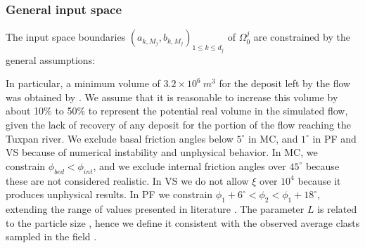 \documentclass[nhess, manuscript]{copernicus}
\begin{document}
\subsubsection{General input space}
The input space boundaries $\left(a_{k,{M_j}},b_{k,{M_j}}\right)_{1\le k\le d_j}$ of $\Omega_0^j$ are constrained by the general assumptions:
In particular, a minimum volume of $3.2 \times 10^6\ m^3$ for the deposit left by the flow was obtained by \cite{Saucedo2008}. We assume that it is reasonable to increase this volume by about 10\% to 50\% to represent the potential real volume in the simulated flow, given the lack of recovery of any deposit for the portion of the flow reaching the Tuxpan river. We exclude basal friction angles below $5^\circ$ in MC, and $1^\circ$ in PF and VS because of numerical instability and unphysical behavior. In MC, we constrain $\phi_{bed}<\phi_{int}$, and we exclude internal friction angles over $45^\circ$ because these are not considered realistic. In VS we do not allow $\xi$ over $10^4$ because it produces unphysical results. In PF we constrain  $\phi_1+6^\circ<\phi_2<\phi_1 + 18^\circ$, extending the range of values presented in literature \citep{PouliquenForterre2002, ForterrePouliquen2003}. The parameter $L$ is related to the particle size \cite{ForterrePouliquen2003},  hence we define it consistent with the observed average clasts sampled in the field \citep{Saucedo2008}.
\end{document}
